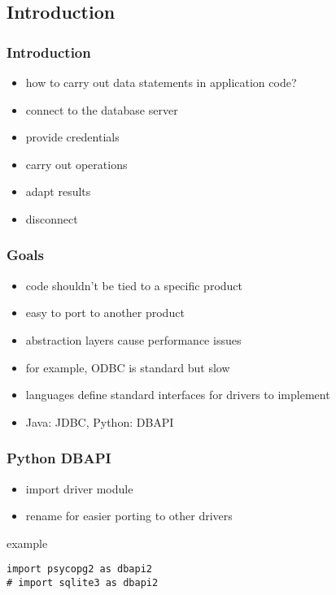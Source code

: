 \documentclass[dvipsnames]{beamer}
\theoremstyle{plain}
\begin{document}
\subsection{Introduction}

\begin{frame}
  \frametitle{Introduction}

  \begin{itemize}
    \item how to carry out data statements in application code?

    \bigskip
    \item connect to the database server
    \item provide credentials

    \medskip
    \item carry out operations
    \item adapt results

    \medskip
    \item disconnect
  \end{itemize}
\end{frame}

\begin{frame}
  \frametitle{Goals}

  \begin{itemize}
    \item code shouldn't be tied to a specific product
    \item easy to port to another product

    \medskip
    \item abstraction layers cause performance issues
    \item for example, ODBC is standard but slow

    \pause
    \bigskip
    \item languages define standard interfaces for drivers to implement
    \item Java: JDBC, Python: DBAPI
  \end{itemize}
\end{frame}

\begin{frame}[fragile]
  \frametitle{Python DBAPI}

  \begin{itemize}
    \item import driver module
    \item rename for easier porting to other drivers
  \end{itemize}

  \begin{exampleblock}{example}
    \begin{lstlisting}
import psycopg2 as dbapi2
# import sqlite3 as dbapi2
    \end{lstlisting}
  \end{exampleblock}
\end{frame}
\end{document}
